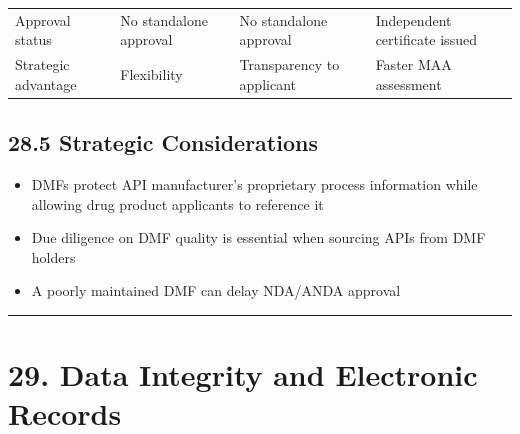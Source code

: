 \documentclass[
  11pt,
  a4paper,
]{report}
\providecommand{\tightlist}{%
  \setlength{\itemsep}{0pt}\setlength{\parskip}{0pt}}
\begin{document}
\begin{longtable}[]{@{}llll@{}}
\begin{minipage}[t]{0.17\columnwidth}
Approval status\strut
\end{minipage} & \begin{minipage}[t]{0.24\columnwidth}\raggedright
No standalone approval\strut
\end{minipage} & \begin{minipage}[t]{0.24\columnwidth}\raggedright
No standalone approval\strut
\end{minipage} & \begin{minipage}[t]{0.24\columnwidth}\raggedright
Independent certificate issued\strut
\end{minipage}\tabularnewline
\begin{minipage}[t]{0.17\columnwidth}\raggedright
Strategic advantage\strut
\end{minipage} & \begin{minipage}[t]{0.24\columnwidth}\raggedright
Flexibility\strut
\end{minipage} & \begin{minipage}[t]{0.24\columnwidth}\raggedright
Transparency to applicant\strut
\end{minipage} & \begin{minipage}[t]{0.24\columnwidth}\raggedright
Faster MAA assessment\strut
\end{minipage}\tabularnewline
\bottomrule
\end{longtable}

\hypertarget{strategic-considerations}{%
\subsection{28.5 Strategic
Considerations}\label{strategic-considerations}}

\begin{itemize}
\tightlist
\item
  DMFs protect API manufacturer's proprietary process information while
  allowing drug product applicants to reference it
\item
  Due diligence on DMF quality is essential when sourcing APIs from DMF
  holders
\item
  A poorly maintained DMF can delay NDA/ANDA approval
\end{itemize}

\begin{center}\rule{0.5\linewidth}{0.5pt}\end{center}

\hypertarget{data-integrity-and-electronic-records}{%
\section{29. Data Integrity and Electronic
Records}\label{data-integrity-and-electronic-records}}
\end{document}
